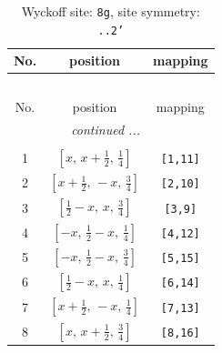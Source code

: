 \documentclass[fleqn,8pt]{jsarticle}
\begin{document}
\begin{longtable}{ccc}
\caption{Wyckoff site: {\tt 8g}, site symmetry: {\tt ..2'}}
 \\
 \hline \hline
No. & position & mapping \\ \hline \endfirsthead

\multicolumn{2}{l}{\tablename\ \thetable{}} \\
 \hline \hline
No. & position & mapping \\ \hline \endhead

 \hline \hline
\multicolumn{2}{r}{\footnotesize\it continued ...} \\ \endfoot

 \hline \hline
\multicolumn{2}{r}{} \\ \endlastfoot

1 & $\left[ x,\, x + \frac{1}{2},\, \frac{1}{4} \right]$ & {\tt [1,11]} \\ \hline
2 & $\left[ x + \frac{1}{2},\, - x,\, \frac{3}{4} \right]$ & {\tt [2,10]} \\ \hline
3 & $\left[ \frac{1}{2} - x,\, x,\, \frac{3}{4} \right]$ & {\tt [3,9]} \\ \hline
4 & $\left[ - x,\, \frac{1}{2} - x,\, \frac{1}{4} \right]$ & {\tt [4,12]} \\ \hline
5 & $\left[ - x,\, \frac{1}{2} - x,\, \frac{3}{4} \right]$ & {\tt [5,15]} \\ \hline
6 & $\left[ \frac{1}{2} - x,\, x,\, \frac{1}{4} \right]$ & {\tt [6,14]} \\ \hline
7 & $\left[ x + \frac{1}{2},\, - x,\, \frac{1}{4} \right]$ & {\tt [7,13]} \\ \hline
8 & $\left[ x,\, x + \frac{1}{2},\, \frac{3}{4} \right]$ & {\tt [8,16]} \\
\end{longtable}
\renewcommand{\arraystretch}{1.2}
\end{document}
